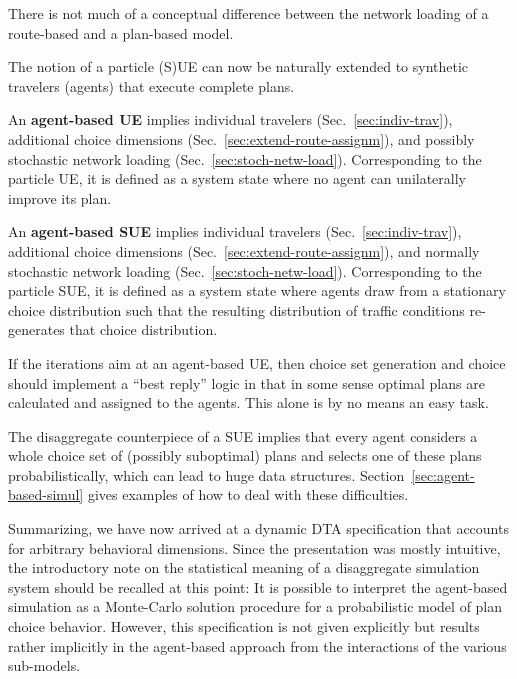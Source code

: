 There is not much of a conceptual difference between the network loading of
a route-based and a plan-based model.

The notion of a particle (S)UE can now be naturally extended to synthetic travelers (agents) that execute complete plans.

An \textbf{agent-based UE} implies individual travelers
(Sec.~\ref{sec:indiv-trav}), additional choice dimensions
(Sec.~\ref{sec:extend-route-assignm}), and possibly stochastic network
loading (Sec.~\ref{sec:stoch-netw-load}).  Corresponding to the
particle UE, it is defined as a system state where no agent can
unilaterally improve its plan.

An \textbf{agent-based SUE} implies individual travelers
(Sec.~\ref{sec:indiv-trav}), additional choice dimensions
(Sec.~\ref{sec:extend-route-assignm}), and normally stochastic network
loading (Sec.~\ref{sec:stoch-netw-load}).  Corresponding to the
particle SUE, it is defined as a system state where agents draw from a
stationary choice distribution such that the resulting distribution of
traffic conditions re-generates that choice distribution.

If the iterations aim at an agent-based UE, then choice set generation
and choice should implement a ``best reply'' logic in that in some
sense optimal plans are calculated and assigned to the agents. This
alone is by no means an easy task.  

The disaggregate counterpiece of a
SUE implies that every agent considers a whole choice set of (possibly
suboptimal) plans and selects one of these plans probabilistically,
which can lead to huge data structures.
Section~\ref{sec:agent-based-simul} gives examples of how to deal with
these difficulties.

Summarizing, we have now arrived at a dynamic DTA specification that accounts for arbitrary behavioral dimensions. Since the presentation was mostly intuitive, the introductory note on the statistical meaning of a disaggregate simulation system should be recalled at this point: It is possible to interpret the agent-based simulation as a Monte-Carlo solution procedure for a probabilistic model of plan choice behavior. However, this specification is not given explicitly but results rather implicitly in the agent-based approach from the interactions of the various sub-models.

